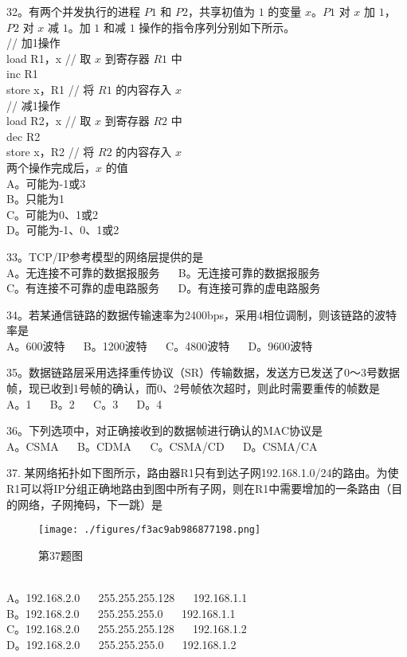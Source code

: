 32。有两个并发执行的进程 $P1$ 和 $P2$，共享初值为 $1$ 的变量 $x$。$P1$ 对 $x$ 加 $1$，$P2$ 对 $x$ 减 $1$。加 $1$ 和减 $1$ 操作的指令序列分别如下所示。 \\

// 加1操作 \\
load R1，x  // 取 $x$ 到寄存器 $R1$ 中 \\
inc R1 \\
store x，R1  // 将 $R1$ 的内容存入 $x$ \\

// 减1操作 \\
load R2，x // 取 $x$ 到寄存器 $R2$ 中 \\
dec R2 \\
store x，R2 // 将 $R2$ 的内容存入 $x$ \\

两个操作完成后，$x$ 的值 \\
A。可能为-1或3 \\
B。只能为1 \\
C。可能为0、1或2 \\
D。可能为-1、0、1或2

33。TCP/IP参考模型的网络层提供的是 \\
A。无连接不可靠的数据报服务 $\quad$ B。无连接可靠的数据报服务 \\
C。有连接不可靠的虚电路服务 $\quad$ D。有连接可靠的虚电路服务

34。若某通信链路的数据传输速率为2400bps，采用4相位调制，则该链路的波特率是 \\
A。600波特 $\quad$ B。1200波特 $\quad$ C。4800波特 $\quad$ D。9600波特

35。数据链路层采用选择重传协议（SR）传输数据，发送方已发送了0～3号数据帧，现已收到1号帧的确认，而0、2号帧依次超时，则此时需要重传的帧数是 \\
A。1 $\quad$ B。2 $\quad$ C。3 $\quad$ D。4

36。下列选项中，对正确接收到的数据帧进行确认的MAC协议是 \\
A。CSMA $\quad$ B。CDMA $\quad$ C。CSMA/CD $\quad$ D。CSMA/CA

37. 某网络拓扑如下图所示，路由器R1只有到达子网192.168.1.0/24的路由。为使R1可以将IP分组正确地路由到图中所有子网，则在R1中需要增加的一条路由（目的网络，子网掩码，下一跳）是 \\
\begin{figure}[ht]
\centering
\texttt{[image: ./figures/f3ac9ab986877198.png]}
\caption{第37题图} \label{fig_Na11_1}
\end{figure}
\\
A。192.168.2.0 $\quad$ 255.255.255.128 $\quad$ 192.168.1.1 \\
B。192.168.2.0 $\quad$ 255.255.255.0 $\quad$ 192.168.1.1 \\
C。192.168.2.0 $\quad$ 255.255.255.128 $\quad$ 192.168.1.2 \\
D。192.168.2.0 $\quad$ 255.255.255.0 $\quad$ 192.168.1.2 \\

